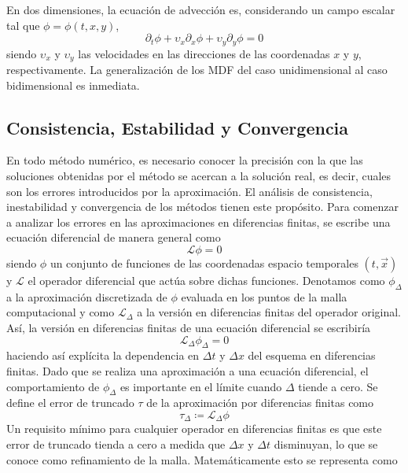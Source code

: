 \documentclass[11pt,twoside,openright,spanish]{report}
\numberwithin{equation}{chapter}
\numberwithin{figure}{chapter}
\numberwithin{table}{chapter}
\begin{document}
En dos dimensiones, la ecuación de advección es, considerando un campo escalar tal que $\phi=\phi(t,x,y)$,
\begin{equation}
\partial_t\phi+\upsilon_x\partial_x \phi+\upsilon_y\partial_y \phi=0
\label{advection2d}
\end{equation}
siendo $\upsilon_x$ y $\upsilon_y$ las velocidades en las direcciones de las coordenadas $x$ y $y$, respectivamente. La generalización de los MDF del caso unidimensional al caso bidimensional es inmediata.

\subsection{Consistencia, Estabilidad y Convergencia}\label{cec}
\noindent
En todo método numérico, es necesario conocer la precisión con la que las soluciones obtenidas por el método se acercan a la solución real, es decir, cuales son los errores introducidos por la aproximación. El análisis de consistencia, inestabilidad y convergencia de los métodos tienen este propósito. Para comenzar a analizar los errores en las aproximaciones en diferencias finitas, se escribe una ecuación diferencial de manera general como
\begin{equation}
\mathcal{L}\phi=0
\end{equation}
siendo $\phi$ un conjunto de funciones de las coordenadas espacio temporales $\left(t,\vec{x}\right)$ y $\mathcal{L}$ el operador diferencial que actúa sobre dichas funciones. Denotamos como $\phi_{\Delta}$ a la aproximación discretizada de $\phi$ evaluada en los puntos de la malla computacional y como $\mathcal{L}_{\Delta}$ a la versión en diferencias finitas del operador original. Así, la versión en diferencias finitas de una ecuación diferencial se escribiría
\begin{equation}
\mathcal{L}_{\Delta}\phi_{\Delta}=0
\end{equation}
haciendo así explícita la dependencia en $\Delta t$ y $\Delta x$ del esquema en diferencias finitas. Dado que se realiza una aproximación a una ecuación diferencial, el comportamiento de $\phi_{\Delta}$ es importante en el límite cuando $\Delta$ tiende a cero. Se define el error de truncado $\tau$ de la aproximación por diferencias finitas como
\begin{equation}
\tau_{\Delta}\coloneqq\mathcal{L}_{\Delta}\phi
\end{equation}
Un requisito mínimo para cualquier operador en diferencias finitas es que este error de truncado tienda a cero a medida que $\Delta x$ y $\Delta t$ disminuyan, lo que se conoce como refinamiento de la malla. Matemáticamente esto se representa como
\end{document}
